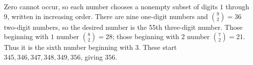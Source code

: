 Zero cannot occur, so each number chooses a nonempty subset of digits $1$ through $9$, written in increasing order. There are nine one-digit numbers and $\binom92=36$ two-digit numbers, so the desired number is the 55th three-digit number. Those beginning with $1$ number $\binom82=28$; those beginning with $2$ number $\binom72=21$. Thus it is the sixth number beginning with $3$. These start $345,346,347,348,349,356$, giving $\boxed{356}$.

